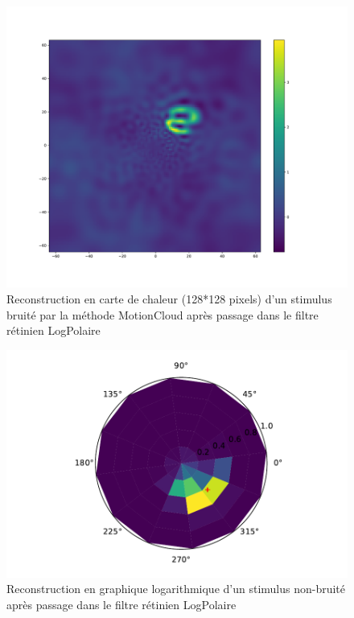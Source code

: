 \begin{figure}[th]
\centering
\includegraphics[scale=0.4]{Figures/mnist_128_LP_MotionCloud}
\decoRule
\caption[Figure]{Reconstruction en carte de chaleur (128*128 pixels) d'un stimulus bruité par la méthode MotionCloud après passage dans le filtre rétinien LogPolaire}
\label{fig:mnist_128_LP_MotionCloud}
\end{figure}

\begin{figure}[th]
\centering
\includegraphics[scale=0.4]{Figures/mnist_log_nonoise}
\decoRule
\caption[Figure]{Reconstruction en graphique logarithmique d'un stimulus non-bruité après passage dans le filtre rétinien LogPolaire}
\label{fig:mnist_log_nonoise}
\end{figure}

